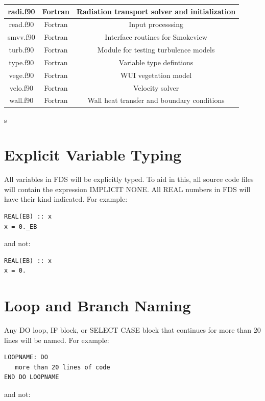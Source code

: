 \documentclass[11pt]{book}
\begin{document}
\begin{table}[ht]
\begin{center}
\begin{tabular}{|c|c|c|}
radi.f90     & Fortran  & Radiation transport solver and initialization  \\ \hline 
read.f90     & Fortran  & Input processsing \\ \hline 
smvv.f90     & Fortran  & Interface routines for Smokeview \\ \hline 
turb.f90     & Fortran  & Module for testing turbulence models \\ \hline 
type.f90     & Fortran  & Variable type defintions \\ \hline 
vege.f90     & Fortran  & WUI vegetation model \\ \hline 
velo.f90     & Fortran  & Velocity solver \\ \hline 
wall.f90     & Fortran  & Wall heat transfer and boundary conditions                   \\ \hline
\end{tabular}s
\end{center}
\end{table}

\section{Explicit Variable Typing}

All variables in FDS will be explicitly typed.  To aid in this, all source code files will contain the expression
{\ct IMPLICIT NONE}.  All {\ct REAL} numbers in FDS will have their kind indicated.  For example:

\begin{verbatim}
REAL(EB) :: x
x = 0._EB
\end{verbatim}

and not:

\begin{verbatim}
REAL(EB) :: x
x = 0.
\end{verbatim}

\section{Loop and Branch Naming}

Any {\ct DO} loop, {\ct IF} block, or {\ct SELECT CASE} block that continues for more than 20 lines will be named.
For example:

\begin{verbatim}
LOOPNAME: DO 
   more than 20 lines of code
END DO LOOPNAME
\end{verbatim}

and not:
\end{document}
